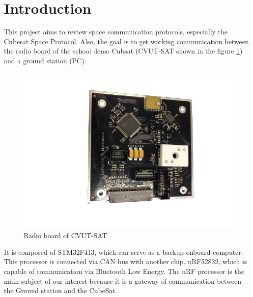 \documentclass[conference]{IEEEtran}
\begin{document}
\section{Introduction}
This project aims to review space communication protocols, especially the Cubesat Space Protocol. Also, the goal is to get working communication between the radio board of the school demo Cubsat (CVUT-SAT\cite{CVUT-SAT} shown in the figure \ref{cvut-sat}) and a ground station (PC).

\begin{figure}[htbp]
    \centerline{\includegraphics[scale=0.4]{images/radio-pcb}}
    \caption{Radio board of CVUT-SAT}
    \label{cvut-sat}
\end{figure}

It is composed of STM32F413, which can serve as a backup onboard computer. This processor is connected via CAN bus with another chip, nRF52832, which is capable of communication via Bluetooth Low Energy. The nRF processor is the main subject of our interest because it is a gateway of communication between the Ground station and the CubeSat.
\end{document}
